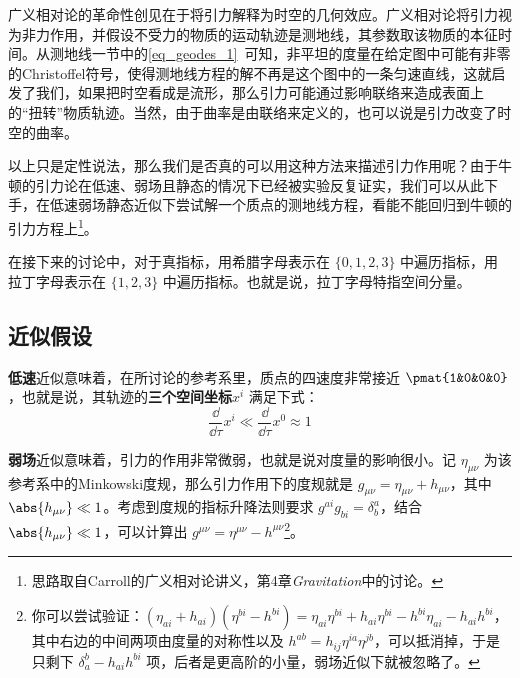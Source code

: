 

广义相对论的革命性创见在于将引力解释为时空的几何效应。广义相对论将引力视为非力作用，并假设不受力的物质的运动轨迹是测地线，其参数取该物质的本征时间。从测地线一节中的\autoref{eq_geodes_1}~可知，非平坦的度量在给定图中可能有非零的Christoffel符号，使得测地线方程的解不再是这个图中的一条匀速直线，这就启发了我们，如果把时空看成是流形，那么引力可能通过影响联络来造成表面上的“扭转”物质轨迹。当然，由于曲率是由联络来定义的，也可以说是引力改变了时空的曲率。

以上只是定性说法，那么我们是否真的可以用这种方法来描述引力作用呢？由于牛顿的引力论在低速、弱场且静态的情况下已经被实验反复证实，我们可以从此下手，在低速弱场静态近似下尝试解一个质点的测地线方程，看能不能回归到牛顿的引力方程上\footnote{思路取自Carroll的广义相对论讲义\cite{CarrollGR}，第4章\textsl{Gravitation}中的讨论。}。

在接下来的讨论中，对于真指标，用希腊字母表示在 $\{0, 1, 2, 3\}$ 中遍历指标，用拉丁字母表示在 $\{1, 2, 3\}$ 中遍历指标。也就是说，拉丁字母特指空间分量。

\subsection{近似假设}

\textbf{低速}近似意味着，在所讨论的参考系里，质点的四速度非常接近 $\pmat{1&0&0&0}$，也就是说，其轨迹的\textbf{三个空间坐标}$x^i$ 满足下式：
\begin{equation}\label{eq_WeakG_1}
\frac{\dd}{\dd \tau}x^i\ll \frac{\dd}{\dd \tau}x^0\approx 1
\end{equation}

\textbf{弱场}近似意味着，引力的作用非常微弱，也就是说对度量的影响很小。记 $\eta_{\mu\nu}$ 为该参考系中的Minkowski度规，那么引力作用下的度规就是 $g_{\mu\nu}=\eta_{\mu\nu}+h_{\mu\nu}$，其中 $\abs{h_{\mu\nu}}\ll 1$。考虑到度规的指标升降法则要求 $g^{ai}g_{bi}=\delta^a_b$，结合 $\abs{h_{\mu\nu}}\ll 1$，可以计算出 $g^{\mu\nu}=\eta^{\mu\nu}-h^{\mu\nu}$\footnote{你可以尝试验证：$(\eta_{ai}+h_{ai})(\eta^{bi}-h^{bi})=\eta_{ai}\eta^{bi}+h_{ai}\eta^{bi}-h^{bi}\eta_{ai}-h_{ai}h^{bi}$，其中右边的中间两项由度量的对称性以及 $h^{ab}=h_{ij}\eta^{ia}\eta^{jb}$，可以抵消掉，于是只剩下 $\delta^b_a-h_{ai}h^{bi}$ 项，后者是更高阶的小量，弱场近似下就被忽略了。}。

